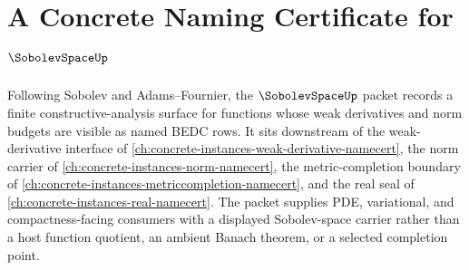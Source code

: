 \chapter{A Concrete Naming Certificate for $\SobolevSpaceUp$}
\label{ch:concrete-instances-sobolev-space-namecert}

Following Sobolev and Adams--Fournier, the $\SobolevSpaceUp$ packet records a finite constructive-analysis surface for functions whose weak derivatives and norm budgets are visible as named BEDC rows. It sits downstream of the weak-derivative interface of \autoref{ch:concrete-instances-weak-derivative-namecert}, the norm carrier of \autoref{ch:concrete-instances-norm-namecert}, the metric-completion boundary of \autoref{ch:concrete-instances-metriccompletion-namecert}, and the real seal of \autoref{ch:concrete-instances-real-namecert}. The packet supplies PDE, variational, and compactness-facing consumers with a displayed Sobolev-space carrier rather than a host function quotient, an ambient Banach theorem, or a selected completion point.

